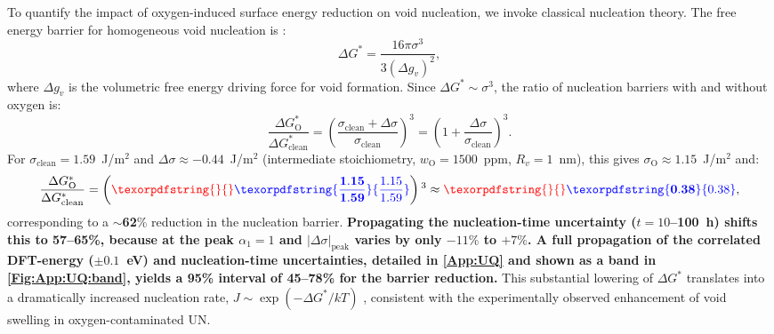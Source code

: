 \documentclass[preprint,12pt,sort&compress]{elsarticle}
\newcommand{\?}{\stackrel{?}{=}}
\providecommand{\DIFaddtex}[1]{{\bf #1}} %
\providecommand{\DIFdeltex}[1]{} %
\providecommand{\DIFaddbegin}{\protect\color{blue}} %
\providecommand{\DIFaddend}{\protect\color{black}} %
\providecommand{\DIFdelbegin}{\protect\color{red}} %
\providecommand{\DIFdelend}{\protect\color{black}} %
\providecommand{\DIFadd}[1]{\texorpdfstring{\DIFaddtex{#1}}{#1}} %
\providecommand{\DIFdel}[1]{\texorpdfstring{\DIFdeltex{#1}}{}} %
\begin{document}
To quantify the impact of oxygen-induced surface energy reduction on void nucleation, we invoke classical nucleation theory. The free energy barrier for homogeneous void nucleation is \cite{Fultz2020}:
\begin{equation}
\Delta G^* = \frac{16 \pi \sigma^3}{3 (\Delta g_v)^2},
\end{equation}
where $\Delta g_v$ is the volumetric free energy driving force for void formation. Since $\Delta G^* \sim \sigma^3$, the ratio of nucleation barriers with and without oxygen is:
\begin{equation}
\frac{\Delta G^*_\text{O}}{\Delta G^*_\text{clean}} = \left( \frac{\sigma_\text{clean} + \Delta \sigma}{\sigma_\text{clean}} \right)^3 = \left( 1 + \frac{\Delta \sigma}{\sigma_\text{clean}} \right)^3.
\end{equation}
For $\sigma_\text{clean} = 1.59$~J/m$^2$ and \DIFdelbegin \DIFdel{$\Delta \sigma \approx -0.4$}\DIFdelend \DIFaddbegin \DIFadd{$\Delta \sigma \approx -0.44$}\DIFaddend ~J/m$^2$ (intermediate stoichiometry, $w_\text{O} = 1500$~ppm, $R_v = 1$~nm), this gives \DIFdelbegin \DIFdel{$\sigma_\text{O} \approx 1.19$}\DIFdelend \DIFaddbegin \DIFadd{$\sigma_\text{O} \approx 1.15$}\DIFaddend ~J/m$^2$ and:
\begin{equation}
\frac{\Delta G^*_\text{O}}{\Delta G^*_\text{clean}} = \left( \DIFdelbegin \DIFdel{\frac{1.19}{1.59} }\DIFdelend \DIFaddbegin \DIFadd{\frac{1.15}{1.59} }\DIFaddend \right)^3 \approx \DIFdelbegin \DIFdel{0.42}\DIFdelend \DIFaddbegin \DIFadd{0.38}\DIFaddend ,
\end{equation}
corresponding to a $\sim$\DIFdelbegin \DIFdel{58}\DIFdelend \DIFaddbegin \DIFadd{62}\DIFaddend \% reduction in the nucleation barrier. \DIFaddbegin \DIFadd{Propagating the nucleation-time uncertainty ($t = 10$--100~h) shifts this to 57--65\%, because at the peak $\alpha_1 = 1$ and $|\Delta\sigma|_\text{peak}$ varies by only $-11\%$ to $+7\%$. A full propagation of the correlated DFT-energy ($\pm0.1$~eV) and nucleation-time uncertainties, detailed in \ref{App:UQ} and shown as a band in \cref{Fig:App:UQ:band}, yields a 95\% interval of 45--78\% for the barrier reduction. }\DIFaddend This substantial lowering of $\Delta G^*$ translates into a dramatically increased nucleation rate, $J \sim \exp(-\Delta G^*/kT)$ \cite{Fultz2020}, consistent with the experimentally observed enhancement of void swelling in oxygen-contaminated UN.
\end{document}
